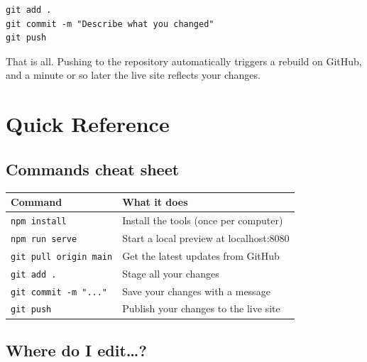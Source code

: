 \documentclass[11pt,a4paper]{article}
\newcommand{\cmd}[1]{\texttt{#1}}
\begin{document}
\begin{lstlisting}[style=shell]
git add .
git commit -m "Describe what you changed"
git push
\end{lstlisting}

\noindent That is all. Pushing to the repository automatically triggers a
rebuild on GitHub, and a minute or so later the live site reflects your
changes.

\section{Quick Reference}

\subsection{Commands cheat sheet}

\begin{center}
\begin{tabular}{@{}p{5.4cm}p{8.2cm}@{}}
\textbf{Command} & \textbf{What it does} \\[2pt]
\hline
\rule{0pt}{2.4ex}%
\cmd{npm install}        & Install the tools (once per computer) \\[3pt]
\cmd{npm run serve}      & Start a local preview at localhost:8080 \\[3pt]
\cmd{git pull origin main} & Get the latest updates from GitHub \\[3pt]
\cmd{git add .}          & Stage all your changes \\[3pt]
\cmd{git commit -m "..."} & Save your changes with a message \\[3pt]
\cmd{git push}           & Publish your changes to the live site \\
\end{tabular}
\end{center}

\subsection{Where do I edit\dots?}
\end{document}
